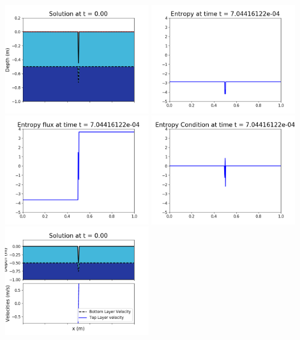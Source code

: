 \documentclass[11pt]{article}
\begin{document}
\includegraphics[width=0.475\textwidth]{frame0003fig1006.png}
\vskip 10pt 
\includegraphics[width=0.475\textwidth]{frame0003fig1007.png}
\includegraphics[width=0.475\textwidth]{frame0003fig1008.png}
\vskip 10pt 
\includegraphics[width=0.475\textwidth]{frame0003fig1009.png}
\vskip 10pt 
\includegraphics[width=0.475\textwidth]{frame0004fig1001.png}
\end{document}
